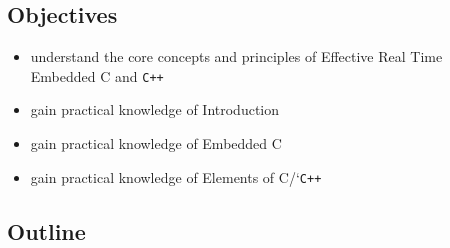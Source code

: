 \documentclass[
]{article}
\providecommand{\tightlist}{%
  \setlength{\itemsep}{0pt}\setlength{\parskip}{0pt}}
\begin{document}
\subsection{Objectives}\label{objectives}

\begin{itemize}
\tightlist
\item
  understand the core concepts and principles of Effective Real Time
  Embedded C and \texttt{C++}
\item
  gain practical knowledge of Introduction
\item
  gain practical knowledge of Embedded C
\item
  gain practical knowledge of Elements of C/`\texttt{C++}
\end{itemize}

\subsection{Outline}\label{outline}
\end{document}
